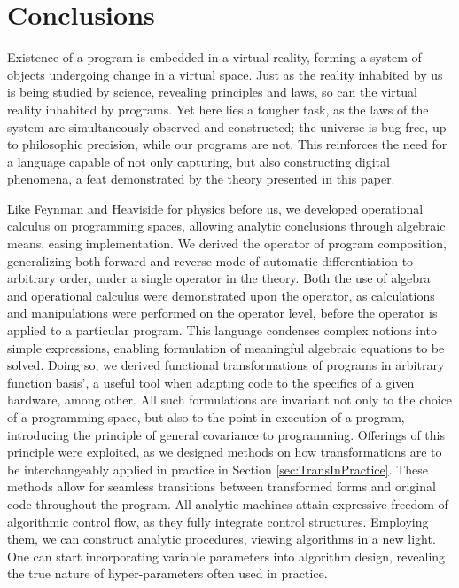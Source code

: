 \documentclass[preprint,12pt]{elsarticle}
\begin{document}
\section{Conclusions}

Existence of a program is embedded in a virtual reality, forming a system of objects undergoing change in a virtual space. Just as the reality inhabited by us is being studied by science, revealing principles and laws, so can the virtual reality inhabited by programs. Yet here lies a tougher task, as the laws of the system are simultaneously observed and constructed; the universe is bug-free, up to philosophic precision, while our programs are not. This reinforces the need for a language capable of not only capturing, but also constructing digital phenomena, a feat demonstrated by the theory presented in this paper. 

Like Feynman \cite{Feynman} and Heaviside \cite{HeavisideOperational} for physics before us, we developed operational calculus on programming spaces, allowing analytic conclusions through algebraic means, easing implementation. We derived the operator of program composition, generalizing both forward \cite{PcAD} and reverse \cite{ReverseAD} mode of automatic differentiation to arbitrary order, under a single operator in the theory. Both the use of algebra and operational calculus were demonstrated upon the operator, as calculations and manipulations were performed on the operator level, before the operator is applied to a particular program.
This language condenses complex notions into simple expressions, enabling formulation of meaningful algebraic equations to be solved. Doing so, we derived functional transformations of programs in arbitrary function basis', a useful tool when adapting code to the specifics of a given hardware, among other.
All such formulations are invariant not only to the choice of a programming space, but also to the point in execution of a program, introducing the principle of general covariance \cite{GeneralCovariance} to programming. Offerings of this principle were exploited, as we designed methods on how transformations are to be interchangeably applied in practice in Section \ref{sec:TransInPractice}. These methods allow for seamless transitions between transformed forms and original code throughout the program. All analytic machines attain expressive freedom of algorithmic control flow, as they fully integrate control structures. Employing them, we can construct analytic procedures, viewing algorithms in a new light. One can start incorporating variable parameters into algorithm design, revealing the true nature of hyper-parameters often used in practice.
\end{document}
